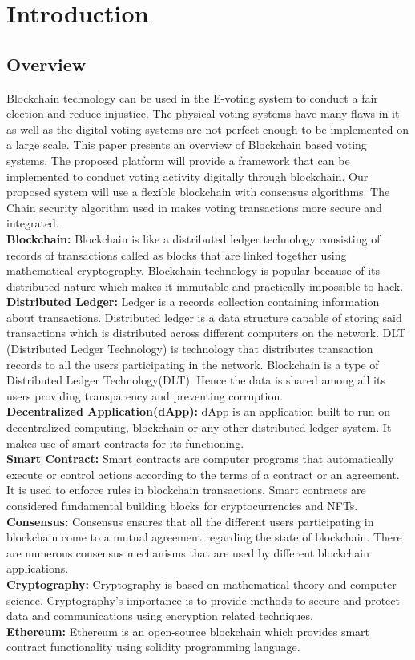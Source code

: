 \documentclass[oneside, 12pt]{book}
\begin{document}
	\section{Introduction}
	\newpage
		\subsection{Overview}
			Blockchain technology can be used in the E-voting system to conduct a fair election and reduce injustice. The physical voting systems have many flaws in it as well as the digital voting systems are not perfect enough to be implemented on a large scale. This paper presents an overview of Blockchain based voting systems. The proposed platform will provide a framework that can be implemented to conduct voting activity digitally through blockchain. Our proposed system will use a flexible blockchain with consensus algorithms. The Chain security algorithm used in makes voting transactions more secure and integrated.
			\\\textbf{Blockchain:} Blockchain is like a distributed ledger technology consisting of records of transactions called as blocks that are linked together using mathematical cryptography. Blockchain technology is popular because of its distributed nature which makes it immutable and practically impossible to hack.
			\\\textbf{Distributed Ledger:} Ledger is a records collection containing information about transactions. Distributed ledger is a data structure capable of storing said transactions which is distributed across different computers on the network. DLT (Distributed Ledger Technology) is technology that distributes transaction records to all the users participating in the network. Blockchain is a type of Distributed Ledger Technology(DLT). Hence the data is shared among all its users providing transparency and preventing corruption.
			\\\textbf{Decentralized Application(dApp):} dApp is an application built to run on decentralized computing, blockchain or any other distributed ledger system. It makes use of smart contracts for its functioning.
			\\\textbf{Smart Contract:} Smart contracts are computer programs that automatically execute or control actions according to the terms of a contract or an agreement. It is used to enforce rules in blockchain transactions. Smart contracts are considered fundamental building blocks for cryptocurrencies and NFTs.
			\\\textbf{Consensus:} Consensus ensures that all the different users participating in blockchain come to a mutual agreement regarding the state of blockchain. There are numerous consensus mechanisms that are used by different blockchain applications.
			\\\textbf{Cryptography:} Cryptography is based on mathematical theory and computer science. Cryptography’s importance is to provide methods to secure and protect data and communications using encryption related techniques.
			\\\textbf{Ethereum:} Ethereum is an open-source blockchain which provides smart contract functionality using solidity programming language.
\end{document}

